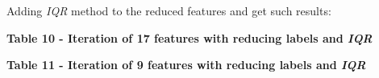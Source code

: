 Adding \emph{IQR} method to the reduced features and get such results:

{\bfseries Table 10 - Iteration of 17 features with reducing labels and
\emph{IQR}}


{\bfseries Table 11 - Iteration of 9 features with reducing labels and
\emph{IQR}}

